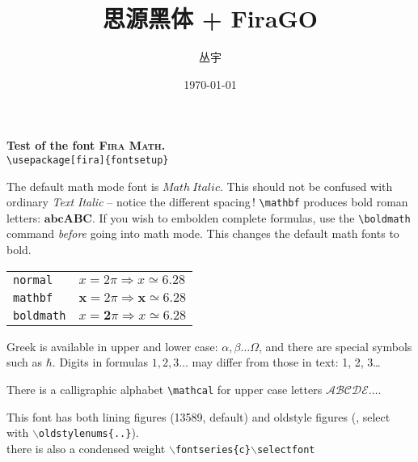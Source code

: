 \documentclass[11pt]{article}
\title{思源黑体 + FiraGO}
\author{丛宇}
\date{\today}
\begin{document}
\maketitle
\begin{center}
{\Large{\bfseries Test of the font {\scshape Fira Math}.}}\bigskip\\
{\Large\verb|\usepackage[fira]{fontsetup}|}
\end{center}

The default math mode font is $Math\ Italic$. This should not be
confused with ordinary \emph{Text Italic} -- notice the different spacing\,!
\verb|\mathbf| produces bold roman letters: $ \mathbf{abcABC} $.
If you wish to embolden complete formulas,
use the \verb|\boldmath| command \emph{before} going into math mode.  
This changes the default math fonts to bold. 
 
\begin{tabular}{ll}
\texttt{normal}   & $ x = 2\pi \Rightarrow x \simeq 6.28 $\\
\texttt{mathbf}   & $\mathbf{x} = 2\pi \Rightarrow \mathbf{x} \simeq 6.28 $\\
\texttt{boldmath} & {\boldmath $x = \mathbf{2}\pi \Rightarrow x 
                   \simeq{\mathbf{6.28}}              $}\\
\end{tabular}
\smallskip

Greek is available in upper and lower case:
$\alpha,\beta \dots \Omega$, and there are special
symbols such as $ \hbar$.
Digits in formulas $1, 2, 3\dots$ may differ from those in text: 1, 2, 3\dots

There is a calligraphic alphabet \verb|\mathcal| for upper case letters
$ \mathcal{ABCDE}\dots $.

\noindent
This font has both lining figures (13589, default) and oldstyle figures (, select with {\tt$\backslash$oldstylenums\{..\}}). 
\\
{\selectfont there is also a condensed weight} {\tt$\backslash$fontseries\{c\}$\backslash$selectfont}
 
\end{document}
